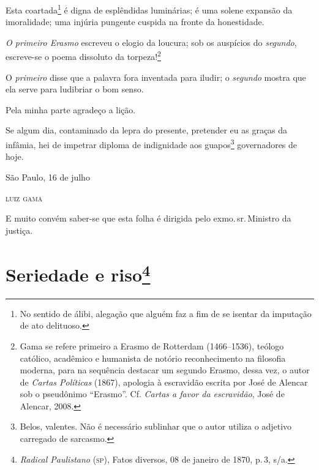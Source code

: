 Esta coartada\footnote{ No sentido de álibi, alegação que alguém faz a
  fim de se isentar da imputação de ato delituoso.} é digna de
esplêndidas luminárias; é uma solene expansão da imoralidade; uma
injúria pungente cuspida na fronte da honestidade.

\emph{O primeiro Erasmo} escreveu o elogio da loucura; sob os
auspícios do \emph{segundo}, escreve-se o poema dissoluto da
torpeza!\footnote{ Gama se refere primeiro a Erasmo de Rotterdam
  (1466--1536), teólogo católico, acadêmico e humanista de notório
  reconhecimento na filosofia moderna, para na sequência destacar um
  segundo Erasmo, dessa vez, o autor de \emph{Cartas Políticas} (1867),
  apologia à escravidão escrita por José de Alencar sob o pseudônimo
  ``Erasmo''. Cf. \emph{Cartas a favor da escravidão}, José de Alencar,
  2008.}

O \emph{primeiro} disse que a palavra fora inventada para iludir; o
\emph{segundo} mostra que ela serve para ludibriar o bom senso.

Pela minha parte agradeço a lição.

Se algum dia, contaminado da lepra do presente, pretender eu as graças
da infâmia, hei de impetrar diploma de indignidade aos guapos\footnote{
  Belos, valentes. Não é necessário sublinhar que o autor utiliza o
  adjetivo carregado de sarcasmo.} governadores de hoje.

\begin{flushright}
São Paulo, 16 de julho

\textsc{luiz gama}
\end{flushright}

\asterisc{}

E muito convém saber-se que esta folha é dirigida pelo exmo.\,sr.\,Ministro da justiça.

\chapter{Seriedade e riso\footnote{\emph{Radical Paulistano} (\textsc{sp}), Fatos diversos,
  08 de janeiro de 1870, p.\,3, s/a.}} %

